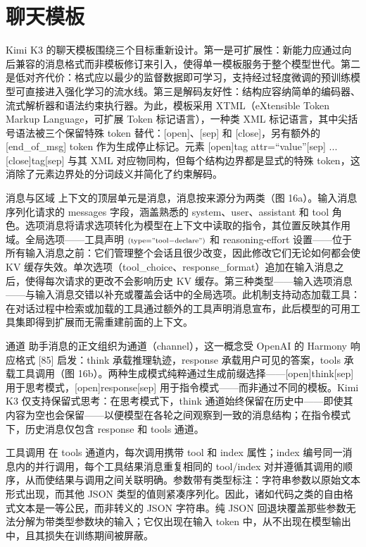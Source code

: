 \documentclass[
  10
]{article}
\begin{document}
\section{聊天模板}\label{f-chat-template}

Kimi K3 的聊天模板围绕三个目标重新设计。第一是可扩展性：新能力应通过向后兼容的消息格式而非模板修订来引入，使得单一模板服务于整个模型世代。第二是低对齐代价：格式应以最少的监督数据即可学习，支持经过轻度微调的预训练模型可直接进入强化学习的流水线。第三是解码友好性：结构应容纳简单的编码器、流式解析器和语法约束执行器。为此，模板采用 XTML（eXtensible Token Markup Language，可扩展 Token 标记语言），一种类 XML 标记语言，其中尖括号语法被三个保留特殊 token 替代：{[}open{]}、{[}sep{]} 和 {[}close{]}，另有额外的 {[}end\_of\_msg{]} token 作为生成停止标记。元素 {[}open{]}tag attr=``value''{[}sep{]} ... {[}close{]}tag{[}sep{]} 与其 XML 对应物同构，但每个结构边界都是显式的特殊 token，这消除了元素边界处的分词歧义并简化了约束解码。

消息与区域 上下文的顶层单元是消息，消息按来源分为两类（图 16a）。输入消息序列化请求的 messages 字段，涵盖熟悉的 system、user、assistant 和 tool 角色。选项消息将请求选项转化为模型在上下文中读取的指令，其位置反映其作用域。全局选项——工具声明 \(\scriptstyle \left( \mathrm{type = "tool-declare"} \right)\) 和 reasoning-effort 设置——位于所有输入消息之前：它们管理整个会话且很少改变，因此修改它们无论如何都会使 KV 缓存失效。单次选项（tool\_choice、response\_format）追加在输入消息之后，使得每次请求的更改不会影响历史 KV 缓存。第三种类型——输入选项消息——与输入消息交错以补充或覆盖会话中的全局选项。此机制支持动态加载工具：在对话过程中检索或加载的工具通过额外的工具声明消息宣布，此后模型的可用工具集即得到扩展而无需重建前面的上下文。

通道 助手消息的正文组织为通道（channel），这一概念受 OpenAI 的 Harmony 响应格式 {[}85{]} 启发：think 承载推理轨迹，response 承载用户可见的答案，tools 承载工具调用（图 16b）。两种生成模式纯粹通过生成前缀选择——{[}open{]}think{[}sep{]} 用于思考模式，{[}open{]}response{[}sep{]} 用于指令模式——而非通过不同的模板。Kimi K3 仅支持保留式思考：在思考模式下，think 通道始终保留在历史中——即使其内容为空也会保留——以便模型在各轮之间观察到一致的消息结构；在指令模式下，历史消息仅包含 response 和 tools 通道。

工具调用 在 tools 通道内，每次调用携带 tool 和 index 属性；index 编号同一消息内的并行调用，每个工具结果消息重复相同的 tool/index 对并遵循其调用的顺序，从而使结果与调用之间关联明确。参数带有类型标注：字符串参数以原始文本形式出现，而其他 JSON 类型的值则紧凑序列化。因此，诸如代码之类的自由格式文本是一等公民，而非转义的 JSON 字符串。纯 JSON 回退块覆盖那些参数无法分解为带类型参数块的输入；它仅出现在输入 token 中，从不出现在模型输出中，且其损失在训练期间被屏蔽。
\end{document}
